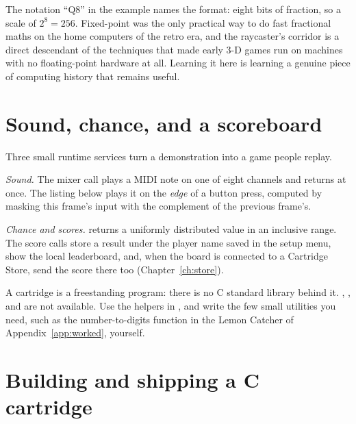 \begin{prgaside}
The notation ``Q8'' in the example names the format: eight bits of fraction, so a
scale of $2^8 = 256$. Fixed-point was the only practical way to do fast fractional
maths on the home computers of the retro era, and the raycaster's corridor is a
direct descendant of the techniques that made early 3-D games run on machines with
no floating-point hardware at all. Learning it here is learning a genuine piece of
computing history that remains useful.
\end{prgaside}

\section{Sound, chance, and a scoreboard}

Three small runtime services turn a demonstration into a game people replay.

\emph{Sound.} The mixer call  plays a MIDI note on one
of eight channels and returns at once. The listing below plays it on the
\emph{edge} of a button press, computed by masking this frame's input with the
complement of the previous frame's.



\emph{Chance and scores.}  returns a
uniformly distributed value in an inclusive range. The score calls store a
result under the player name saved in the setup menu, show the local
leaderboard, and, when the board is connected to a Cartridge Store, send the
score there too (Chapter~\ref{ch:store}).



\begin{prgwarn}
A cartridge is a freestanding program: there is no C standard library behind it.
, , and  are not available. Use the helpers
in , and write the few small utilities you need, such as the
number-to-digits function in the Lemon Catcher of Appendix~\ref{app:worked},
yourself.
\end{prgwarn}

\section{Building and shipping a C cartridge}

